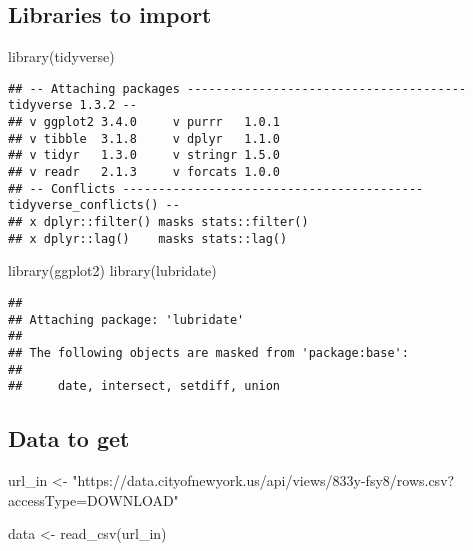 \documentclass[
]{article}
\newenvironment{Shaded}{\begin{snugshade}}{\end{snugshade}}
\newcommand{\FunctionTok}[1]{\textcolor[rgb]{0.00,0.00,0.00}{#1}}
\newcommand{\NormalTok}[1]{#1}
\newcommand{\OtherTok}[1]{\textcolor[rgb]{0.56,0.35,0.01}{#1}}
\newcommand{\StringTok}[1]{\textcolor[rgb]{0.31,0.60,0.02}{#1}}
\begin{document}
\hypertarget{libraries-to-import}{%
\subsection{Libraries to import}\label{libraries-to-import}}

\begin{Shaded}
\begin{Highlighting}[]
\FunctionTok{library}\NormalTok{(tidyverse) }
\end{Highlighting}
\end{Shaded}

\begin{verbatim}
## -- Attaching packages --------------------------------------- tidyverse 1.3.2 --
## v ggplot2 3.4.0     v purrr   1.0.1
## v tibble  3.1.8     v dplyr   1.1.0
## v tidyr   1.3.0     v stringr 1.5.0
## v readr   2.1.3     v forcats 1.0.0
## -- Conflicts ------------------------------------------ tidyverse_conflicts() --
## x dplyr::filter() masks stats::filter()
## x dplyr::lag()    masks stats::lag()
\end{verbatim}

\begin{Shaded}
\begin{Highlighting}[]
\FunctionTok{library}\NormalTok{(ggplot2)}
\FunctionTok{library}\NormalTok{(lubridate)}
\end{Highlighting}
\end{Shaded}

\begin{verbatim}
## 
## Attaching package: 'lubridate'
## 
## The following objects are masked from 'package:base':
## 
##     date, intersect, setdiff, union
\end{verbatim}

\hypertarget{data-to-get}{%
\subsection{Data to get}\label{data-to-get}}

\begin{Shaded}
\begin{Highlighting}[]
\NormalTok{url\_in }\OtherTok{\textless{}{-}} \StringTok{"https://data.cityofnewyork.us/api/views/833y{-}fsy8/rows.csv?accessType=DOWNLOAD"}
\end{Highlighting}
\end{Shaded}

\begin{Shaded}
\begin{Highlighting}[]
\NormalTok{data }\OtherTok{\textless{}{-}} \FunctionTok{read\_csv}\NormalTok{(url\_in)}
\end{Highlighting}
\end{Shaded}
\end{document}
